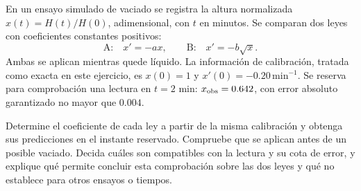 En un ensayo simulado de vaciado se registra la altura normalizada \(x(t)=H(t)/H(0)\), adimensional, con \(t\) en minutos. Se comparan dos leyes con coeficientes constantes positivos:
\[
\text{A:}\quad x'=-a x,
\qquad
\text{B:}\quad x'=-b\sqrt{x}.
\]
Ambas se aplican mientras quede líquido. La información de calibración, tratada como exacta en este ejercicio, es \(x(0)=1\) y \(x'(0)=-0.20\,\mathrm{min}^{-1}\). Se reserva para comprobación una lectura en \(t=2\) min: \(x_{\rm obs}=0.642\), con error absoluto garantizado no mayor que \(0.004\).

Determine el coeficiente de cada ley a partir de la misma calibración y obtenga sus predicciones en el instante reservado. Compruebe que se aplican antes de un posible vaciado. Decida cuáles son compatibles con la lectura y su cota de error, y explique qué permite concluir esta comprobación sobre las dos leyes y qué no establece para otros ensayos o tiempos.
